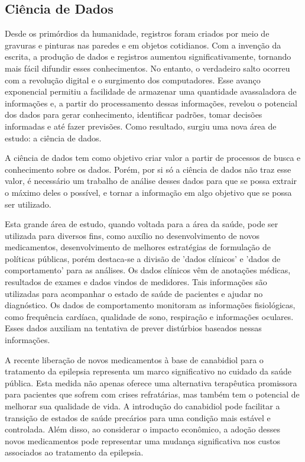 \documentclass[article,a4paper,12pt,brazil,sumario=tradicional]{abntex2}
\begin{document}
\subsection{Ciência de Dados}

Desde os primórdios da humanidade, registros foram criados por meio de gravuras e pinturas nas paredes e em objetos cotidianos. Com a invenção da escrita, a produção de dados e registros aumentou significativamente, tornando mais fácil difundir esses conhecimentos. No entanto, o verdadeiro salto ocorreu com a revolução digital e o surgimento dos computadores. Esse avanço exponencial permitiu a facilidade de armazenar uma quantidade avassaladora de informações e, a partir do processamento dessas informações, revelou o potencial dos dados para gerar conhecimento, identificar padrões, tomar decisões informadas e até fazer previsões. Como resultado, surgiu uma nova área de estudo: a ciência de dados.

A ciência de dados tem como objetivo criar valor a partir de processos de busca e conhecimento sobre os dados. Porém, por si só a ciência de dados não traz esse valor, é necessário um trabalho de análise desses dados para que se possa extrair o máximo deles o possível, e tornar a informação em algo objetivo que se possa ser utilizado.

Esta grande área de estudo, quando voltada para a área da saúde, pode ser utilizada para diversos fins, como auxílio no desenvolvimento de novos medicamentos, desenvolvimento de melhores estratégias de formulação de políticas públicas, porém destaca-se a divisão de 'dados clínicos' e 'dados de comportamento' para as análises. Os dados clínicos vêm de anotações médicas, resultados de exames e dados vindos de medidores. Tais informações são utilizadas para acompanhar o estado de saúde de pacientes e ajudar no diagnóstico. Os dados de comportamento monitoram as informações fisiológicas, como frequência cardíaca, qualidade de sono, respiração e informações oculares. Esses dados auxiliam na tentativa de prever distúrbios baseados nessas informações.

A recente liberação de novos medicamentos à base de canabidiol para o tratamento da epilepsia representa um marco significativo no cuidado da saúde pública. Esta medida não apenas oferece uma alternativa terapêutica promissora para pacientes que sofrem com crises refratárias, mas também tem o potencial de melhorar sua qualidade de vida. A introdução do canabidiol pode facilitar a transição de estados de saúde precários para uma condição mais estável e controlada. Além disso, ao considerar o impacto econômico, a adoção desses novos medicamentos pode representar uma mudança significativa nos custos associados ao tratamento da epilepsia.
\end{document}
